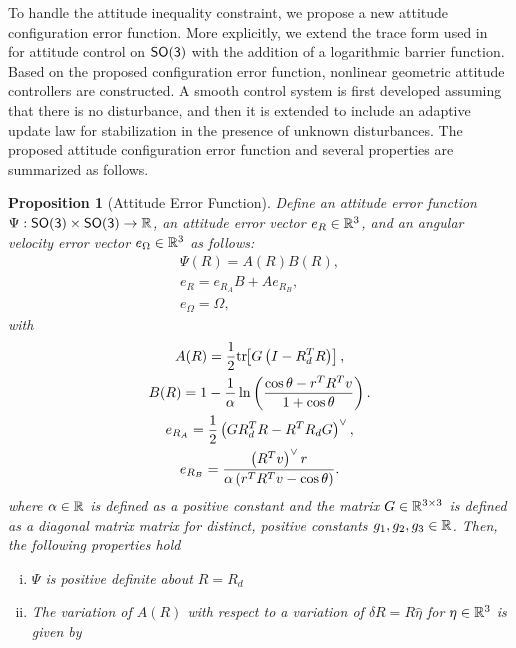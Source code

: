 \documentclass[letterpaper, 10 pt, conference]{ieeeconf}  %
\newtheorem{prop}{Proposition}
\begin{document}
To handle the attitude inequality constraint, we propose a new attitude configuration error function. 
More explicitly, we extend the trace form used in~\cite{bullo2004,LeeITCST13} for attitude control on \(\mathsf{SO(3)}\) with the addition of a logarithmic barrier function. 
Based on the proposed configuration error function,  nonlinear geometric attitude controllers are constructed. 
A smooth control system is first developed assuming that there is  no disturbance, and then it is extended to include an adaptive update law for stabilization in the presence of unknown disturbances. 
The proposed attitude configuration error function and several properties are summarized as follows.

\begin{prop}[Attitude Error Function] \label{prop:config_error}
Define an attitude error function \( \Psi : \mathsf{SO(3)} \times \mathsf{SO(3)} \to \mathbb{R} \), an attitude error vector \( e_R \in \mathbb{R}^3 \), and an angular velocity error vector \( e_\Omega \in \mathbb{R}^3 \) as follows:
\begin{gather}
	\Psi(R) = A(R) B(R) , \label{eqn:psi} \\
	e_R = e_{R_A} B + A e_{R_B} , \label{eqn:eR} \\
	e_\Omega = \Omega , \label{eqn:eW}
\end{gather}
with
\begin{gather}
	A(R) = \frac{1}{2} \mathrm{tr}\negthickspace\left[ G \left( I - R_d^T R\right) \right] , \label{eqn:A} \\
	B(R) = 1 - \frac{1}{\alpha} \ln \left( \frac{\cos \theta -  r^T R^T v}{1 + \cos \theta}\right) . \label{eqn:B} \\
	e_{R_A} = \frac{1}{2} \left( G R_d^T R - R^T R_d G \right) ^ \vee , \label{eqn:eRA} \\
	e_{R_B} = \frac{ \left( R^T v\right)^\vee r}{\alpha \left(r^T R^T v - \cos \theta \right)} . \label{eqn:eRB} 
\end{gather}	
where \( \alpha \in \mathbb{R} \) is defined as a positive constant and the matrix \( G \in \mathbb{R}^{3 \times 3} \) is defined as a diagonal matrix matrix for distinct, positive constants \( g_1, g_2, g_3 \in \mathbb{R} \).
Then, the following properties hold
\begin{enumerate}[(i)]
	\item \label{item:prop_psi_psd} \(\Psi\) is positive definite about \( R = R_d\)
	\item \label{item:prop_era}The variation of \( A(R) \) with respect to a variation of \( \delta R = R \hat{\eta} \) for \( \eta \in \mathbb{R}^3 \) is given by

\end{enumerate}
\end{prop}
\end{document}
